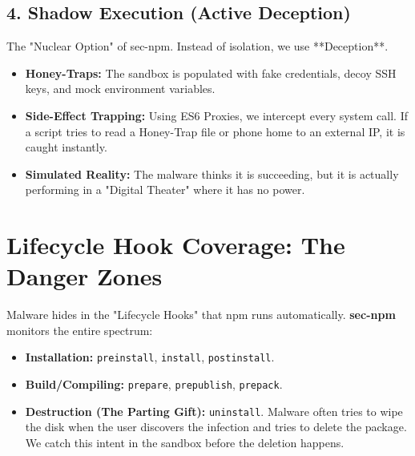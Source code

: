 \documentclass[12pt,a4paper]{article}
\begin{document}
\subsection{4. Shadow Execution (Active Deception)}
The "Nuclear Option" of sec-npm. Instead of isolation, we use **Deception**.
\begin{itemize}
    \item \textbf{Honey-Traps:} The sandbox is populated with fake credentials, decoy SSH keys, and mock environment variables. 
    \item \textbf{Side-Effect Trapping:} Using ES6 Proxies, we intercept every system call. If a script tries to read a Honey-Trap file or phone home to an external IP, it is caught instantly.
    \item \textbf{Simulated Reality:} The malware thinks it is succeeding, but it is actually performing in a "Digital Theater" where it has no power.
\end{itemize}

\section{Lifecycle Hook Coverage: The Danger Zones}
Malware hides in the "Lifecycle Hooks" that npm runs automatically. \textbf{sec-npm} monitors the entire spectrum:
\begin{itemize}
    \item \textbf{Installation:} \texttt{preinstall}, \texttt{install}, \texttt{postinstall}.
    \item \textbf{Build/Compiling:} \texttt{prepare}, \texttt{prepublish}, \texttt{prepack}.
    \item \textbf{Destruction (The Parting Gift):} \texttt{uninstall}. Malware often tries to wipe the disk when the user discovers the infection and tries to delete the package. We catch this intent in the sandbox before the deletion happens.
\end{itemize}
\end{document}
